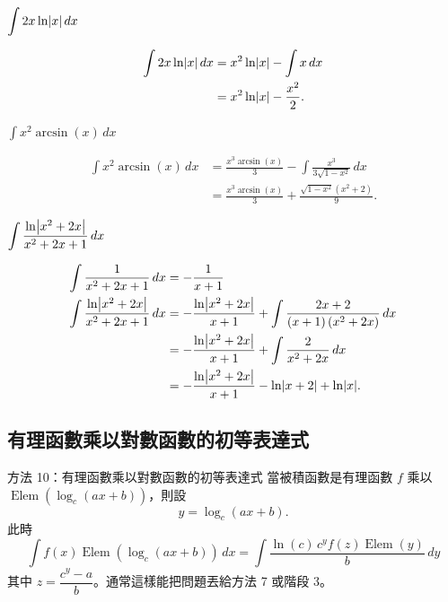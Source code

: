 \documentclass{beamer}
\newcommand{\Left} {\mathopen{}\mathclose\bgroup\left}
\newcommand{\Right}{\aftergroup\egroup\right}
\newcommand{\Elem}{\operatorname{Elem}}
\theoremstyle{remark}
\begin{document}
\begin{frame}{$\displaystyle \int 2x \ln \Left| x \Right|\,dx$}
  \begin{solution}
    \begin{align*}
      \int 2x \ln \Left| x \Right|\,dx &= x^2 \ln \Left| x \Right| - \int x\,dx\\
	&= x^2 \ln \Left| x \Right| - \frac{x^2}{2}.
    \end{align*}
  \end{solution}
\end{frame}

\begin{frame}{$\displaystyle \int x^2 \arcsin(x)\,dx$}
  \begin{solution}
    \begin{align*}
      \int x^2 \arcsin(x)\,dx &= \frac{x^3 \arcsin(x)}{3} - \int \frac{x^3}{3 \sqrt{1 - x^2}}\,dx\\
	&= \frac{x^3 \arcsin(x)}{3} + \frac{\sqrt{1 - x^2} \left( x^2 + 2 \right)}{9}.
    \end{align*}
  \end{solution}
\end{frame}

\begin{frame}{$\displaystyle \int \frac{\ln \Left| x^2 + 2x \Right|}{x^2 + 2x + 1}\,dx$}
  \begin{solution}
    \begin{align*}
      \int \frac{1}{x^2 + 2x + 1}\,dx &= -\frac{1}{x+1}\\
      \int \frac{\ln \Left| x^2 + 2x \Right|}{x^2 + 2x + 1}\,dx
	&= -\frac{\ln \Left| x^2 + 2x \Right|}{x+1} + \int \frac{2x + 2}{(x+1) \left( x^2 + 2x \right)}\,dx\\
	&= -\frac{\ln \Left| x^2 + 2x \Right|}{x+1} + \int \frac{2}{x^2 + 2x}\,dx\\
	&= -\frac{\ln \Left| x^2 + 2x \Right|}{x+1} - \ln \Left| x+2 \Right| + \ln \Left| x \Right|.
    \end{align*}
  \end{solution}
\end{frame}

\subsection[對數替代]{有理函數乘以對數函數的初等表達式}
\begin{frame}{方法 10：有理函數乘以對數函數的初等表達式}
  當被積函數是有理函數 $f$ 乘以 $\Elem(\log_c(ax + b))$，則設
  \[y = \log_c(ax + b).\]
  此時
  \[\int f(x) \Elem(\log_c(ax + b))\,dx = \int \frac{\ln(c)\,c^y f(z) \Elem(y)}{b}\,dy\]
  其中 $z = \dfrac{c^y - a}{b}$。通常這樣能把問題丟給方法 7 或階段 3。
\end{frame}
\end{document}
